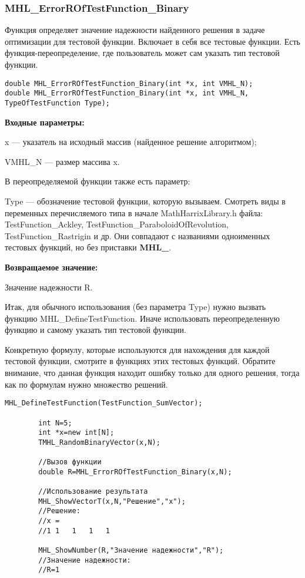 \documentclass[a4paper,12pt]{article}
\begin{document}
\subsubsection{MHL\_ErrorROfTestFunction\_Binary}\label{MHL_ErrorROfTestFunction_Binary}

Функция определяет значение надежности найденного решения в задаче оптимизации для тестовой функции. Включает в себя все тестовые функции. Есть функция-переопределение, где пользователь может сам указать тип тестовой функции.


\begin{lstlisting}[label=code_syntax_MHL_ErrorROfTestFunction_Binary,caption=Синтаксис]
double MHL_ErrorROfTestFunction_Binary(int *x, int VMHL_N);
double MHL_ErrorROfTestFunction_Binary(int *x, int VMHL_N, TypeOfTestFunction Type);
\end{lstlisting}

\textbf{Входные параметры:}

x --- указатель на исходный массив (найденное решение алгоритмом);

VMHL\_N --- размер массива x.

В переопределяемой функции также есть параметр:
  
Type --- обозначение тестовой функции, которую вызываем.
Смотреть виды в переменных перечисляемого типа в начале MathHarrixLibrary.h файла: TestFunction\_Ackley, TestFunction\_ParaboloidOfRevolution, TestFunction\_Rastrigin и др. Они совпадают с названиями одноименных тестовых функций, но без приставки \textbf{MHL\_}.

\textbf{Возвращаемое значение:}
 
Значение надежности R.

Итак, для обычного использования (без параметра Type) нужно вызвать функцию MHL\_DefineTestFunction. Иначе использовать переопределенную функцию и самому указать тип тестовой функции.

Конкретную формулу, которые используются для нахождения для каждой тестовой функции, смотрите в функциях этих тестовых функций. Обратите внимание, что данная функция находит ошибку только для одного решения, тогда как по формулам нужно множество решений.


\begin{lstlisting}[label=code_use_MHL_ErrorROfTestFunction_Binary,caption=Пример использования]
        MHL_DefineTestFunction(TestFunction_SumVector);

        int N=5;
        int *x=new int[N];
        TMHL_RandomBinaryVector(x,N);

        //Вызов функции
        double R=MHL_ErrorROfTestFunction_Binary(x,N);

        //Использование результата
        MHL_ShowVectorT(x,N,"Решение","x");
        //Решение:
        //x =
        //1	1	1	1	1

        MHL_ShowNumber(R,"Значение надежности","R");
        //Значение надежности:
        //R=1
\end{lstlisting}
\end{document}
